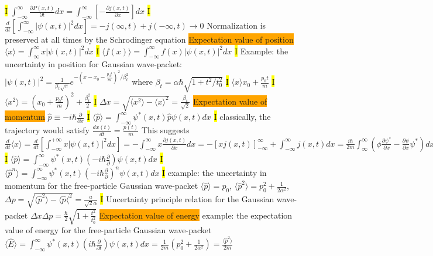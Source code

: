 \documentclass[fontsize=4pt]{scrartcl}
\begin{document}
\hl{I}
$\int_{-\infty}^{\infty} \frac{\partial P(x,t)}{\partial t}dx = \int_{-\infty}^{\infty}[-\frac{\partial j (x,t)}{\partial x}]dx$
\hl{I}
$\frac{d}{dt}[\int_{-\infty}^{\infty} |\psi(x,t)|^2 dx] = - j(\infty,t) + j(-\infty,t) \rightarrow 0$ Normalization is preserved at all times by the Schrodinger equation
\colorbox{Orange}{Expectation value of position}
$\langle x \rangle = \int_{\infty}^{\infty} x |\psi(x,t)|^2 dx$
\hl{I}
$\langle f(x) \rangle = \int_{-\infty}^{\infty} f(x) |\psi(x,t)|^2 dx$
\hl{I}
Example: the uncertainty in position for Gaussian wave-packet: 
$|\psi(x,t)|^2 = \frac{1}{\beta_t \sqrt{\pi}}e^{-(x-x_0-\frac{p_0 t}{m})^2/\beta_t^2}$ where $\beta_t = \alpha \hbar \sqrt{1+t^2 /t_0^2}$
\hl{I}
$\langle x \rangle x_0 + \frac{p_0 t}{m}$
\hl{I}
$\langle x^2 \rangle = (x_0 + \frac{p_0 t}{m})^2 + \frac{\beta_t^2}{2}$
\hl{I}
$\Delta x = \sqrt{\langle x^2 \rangle - \langle x \rangle^2} = \frac{\beta_t}{\sqrt{2}}$
\colorbox{Orange}{Expectation value of momentum}
$\hat{p} \equiv -i\hbar \frac{\partial}{\partial x}$
\hl{I}
$\langle \hat{p} \rangle = \int_{-\infty}^{\infty} \psi^* (x,t) \hat{p}\psi(x,t)dx$
\hl{I}
classically, the trajectory would satisfy $\frac{dx(t)}{dt} = \frac{p(t)}{m}$
This suggests 
$\frac{d}{dt}\langle x \rangle = \frac{d}{dt}[\int_{-\infty}^{+\infty} x |\psi(x,t)|^2 dx ] = - \int_{-\infty}^{\infty} x \frac{\partial j(x,t)}{\partial x} dx = -[xj(x,t)]_{-\infty}^{\infty} + \int_{-\infty}^{\infty} j(x,t) dx = \frac{i\hbar}{2m} \int_{\infty}^{\infty} (\phi \frac{\partial \psi^*}{\partial x} - \frac{\partial \psi}{\partial x} \psi^* )dx = \frac{1}{m}\int_{-\infty}^{\infty}\psi^*(-i\hbar \frac{\partial}{\partial x}) \psi dx + \frac{i \hbar}{2m} [\psi \psi^*]_{-\infty}^{\infty} = \frac{\langle \hat{p} \rangle}{m}$
\hl{I}
$\langle \hat{p} \rangle = \int_{-\infty}^{\infty} \psi^*(x,t) (-i\hbar \frac{\partial}{\partial}) \psi (x,t) dx$
\hl{I}
$\langle \hat{p}^n \rangle = \int_{-\infty}^{\infty} \psi^*(x,t) (-i\hbar \frac{\partial}{\partial})^n \psi (x,t) dx$
\hl{I}
example: the uncertainty in momentum for the free-particle Gaussian wave-packet
$\langle \hat{p} \rangle = p_0$, $\langle \hat{p}^2 \rangle = p_0^2 + \frac{1}{2\alpha^2}$, $\Delta p = \sqrt{\langle \hat{p}^2 \rangle - \langle \hat{p} \langle^2}
= \frac{a}{\sqrt{2}\alpha}$
\hl{I}
Uncertainty principle relation for the Gaussian wave-packet
$\Delta x \Delta p = \frac{\hbar}{2}\sqrt{1+\frac{t^2}{t_0^2}}$
\colorbox{Orange}{Expectation value of energy}
example: the expectation value of energy for the free-particle Gaussian wave-packet
$\langle \hat{E} \rangle = \int_{-\infty}^{\infty} \psi^*(x,t)(i\hbar \frac{\partial}{\partial t}) \psi(x,t) dx = \frac{1}{2m}(p_0^2 + \frac{1}{2\alpha^2}) = \frac{\langle \hat{p}^2 \rangle}{2m}$
\end{document}
